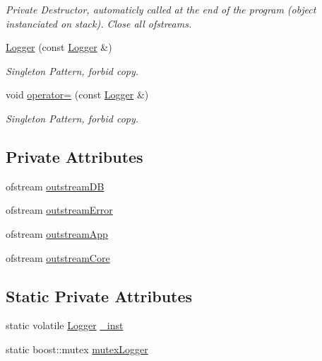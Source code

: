 \begin{DoxyCompactItemize}
\begin{DoxyCompactList}\small\item\em Private Destructor, automaticly called at the end of the program (object instanciated on stack). Close all ofstreams. \end{DoxyCompactList}\item 
\hyperlink{class_logger_ad1dc4093a3d8c26802357fe2bdb1dabf}{Logger} (const \hyperlink{class_logger}{Logger} \&)
\begin{DoxyCompactList}\small\item\em Singleton Pattern, forbid copy. \end{DoxyCompactList}\item 
void \hyperlink{class_logger_a5c87941ccde39bcd5ce51496987d822f}{operator=} (const \hyperlink{class_logger}{Logger} \&)
\begin{DoxyCompactList}\small\item\em Singleton Pattern, forbid copy. \end{DoxyCompactList}\end{DoxyCompactItemize}
\subsection*{Private Attributes}
\begin{DoxyCompactItemize}
\item 
ofstream \hyperlink{class_logger_a17c9760c7e2905943827e9bd39184234}{outstream\+D\+B}
\item 
ofstream \hyperlink{class_logger_a0f77a112075ae81cfc89f79225967486}{outstream\+Error}
\item 
ofstream \hyperlink{class_logger_aa072491e9f6b7208344fb26b79225c26}{outstream\+App}
\item 
ofstream \hyperlink{class_logger_a2a107070a319d033978c6af26dd733fd}{outstream\+Core}
\end{DoxyCompactItemize}
\subsection*{Static Private Attributes}
\begin{DoxyCompactItemize}
\item 
static volatile \hyperlink{class_logger}{Logger} \hyperlink{class_logger_a39df000f4fac08812f2d0d86aac1d515}{\+\_\+inst}
\item 
static boost\+::mutex \hyperlink{class_logger_a24ccccd925d3a0f19a7f1ad04f112fd9}{mutex\+Logger}
\end{DoxyCompactItemize}



